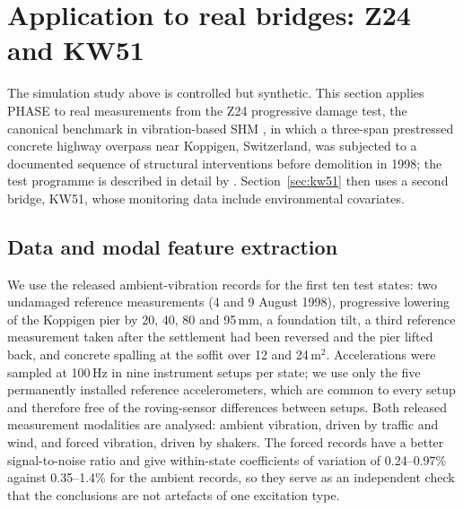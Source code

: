 \documentclass[12pt,a4paper]{article}
\newcommand{\rev}[1]{#1}
\newcommand{\rev}[1]{{\color{revcol}#1}}
\begin{document}
\section{Application to real bridges: Z24 and KW51}\label{sec:z24}

The simulation study above is controlled but synthetic. This section applies PHASE to real measurements from the Z24 progressive damage test, the canonical benchmark in vibration-based SHM \citep{peeters2001z24}, in which a three-span prestressed concrete highway overpass near Koppigen, Switzerland, was subjected to a documented sequence of structural interventions before demolition in 1998; the test programme is described in detail by \citet{reynders2009z24}. \rev{Section~\ref{sec:kw51} then uses a second bridge, KW51, whose monitoring data include environmental covariates.}

\subsection{Data and modal feature extraction}

We use the released ambient-vibration records for the first ten test states: two undamaged reference measurements (4 and 9 August 1998), progressive lowering of the Koppigen pier by 20, 40, 80 and 95\,mm, a foundation tilt, a third reference measurement taken after the settlement had been reversed and the pier lifted back, and concrete spalling at the soffit over 12 and 24\,m$^2$. Accelerations were sampled at 100\,Hz in nine instrument setups per state; we use only the five permanently installed reference accelerometers, which are common to every setup and therefore free of the roving-sensor differences between setups. Both released measurement modalities are analysed: ambient vibration, driven by traffic and wind, and forced vibration, driven by shakers. The forced records have a better signal-to-noise ratio and give within-state coefficients of variation of 0.24--0.97\% against 0.35--1.4\% for the ambient records, so they serve as an independent check that the conclusions are not artefacts of one excitation type.
\end{document}
